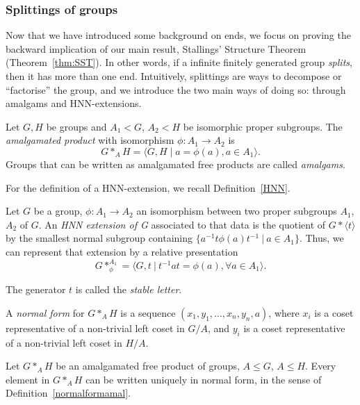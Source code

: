 \subsubsection{Splittings of groups}
Now that we have introduced some background on ends, we focus on proving the backward implication of our main result, Stallings' Structure Theorem (Theorem~\ref{thm:SST}). In other words, if a infinite finitely generated group \emph{splits}, then it has more than one end. Intuitively, splittings are ways to decompose or ``factorise'' the group, and we introduce the two main ways of doing so: through amalgams and HNN-extensions.

 \begin{definition}\label{defnamalgamatedproduct}
     Let \(G,H\) be groups and \(A_1 < G\), \(A_2 < H\) be isomorphic proper subgroups. The \emph{amalgamated product} with isomorphism \(\phi: A_1 \to A_2\) is 
     \[
     G *_A H = \langle G,H \mid a = \phi(a), a \in A_1 \rangle .
     \]
     Groups that can be written as amalgamated free products are called \emph{amalgams}.
 \end{definition}

For the definition of a HNN-extension, we recall Definition~\ref{HNN}.

 \begin{definition}
     Let $G$ be a group, $\phi: A_1 \to A_2$ an isomorphism between two proper subgroups $A_1$,$A_2$ of $G$. An \emph{HNN extension of G} associated to that data is the quotient of $G \ast \langle t \rangle$ by the smallest normal subgroup containing $\{a^{-1}t\phi(a)t^{-1} \: | \: a \in A_1 \}$. Thus, we can represent that extension by a relative presentation 
    \[G \ast_\phi^{A_1} = \langle G,t \: | \: t^{-1}at = \phi(a), \forall a \in A_1 \rangle. \]

    The generator \(t\) is called the \emph{stable letter}.
 \end{definition}

\begin{definition}
\label{normalformamal}
    A \emph{normal form} for \(G *_A H\) is a sequence \((x_1, y_1, \dots,x_n, y_n, a)\), where \(x_i\) is a coset representative of a non-trivial left coset in \(G/A\), and \(y_i\) is a coset representative of a non-trivial left coset in \(H/A\).
\end{definition}

\begin{lemma}
    Let \(G *_A H\) be an amalgamated free product of groups, \(A \leq G\), \(A \leq H\). Every element in \(G *_A H\) can be written uniquely in normal form, in the sense of Definition~\ref{normalformamal}. 
\end{lemma}

